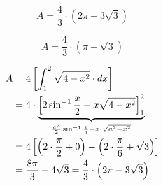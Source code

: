 \documentclass[14pt,fleqn]{extarticle}
\begin{document}
\newcard 

\[ A = \frac{4}{3}\cdot \left(2\pi-3\sqrt{3} \right)\]

\newcard 

\[ A = \frac{4}{3}\cdot \left(\pi-\sqrt{3} \right)\]

\newcard 
\begin{align}
A &= 4 \left[\int_1^2 \sqrt{4-x^2}\cdot dx \right] \\
&= 4\cdot \underbrace{\left[2\sin^{-1}\frac{x}{2} + x\sqrt{4-x^2} \right]_1^2}_{\frac{a^2}{2}\sin^{-1}\frac{x}{a}+x\cdot\sqrt{a^2-x^2}} \\
&= 4 \left[\left(2 \cdot\frac{\pi}{2} + 0 \right) - \left(2\cdot\frac{\pi}{6} + \sqrt{3} \right) \right] \\
&= \frac{8\pi}{3} - 4\sqrt{3} = \frac{4}{3}\cdot \left(2\pi-3\sqrt{3} \right)
\end{align}
\end{document}
